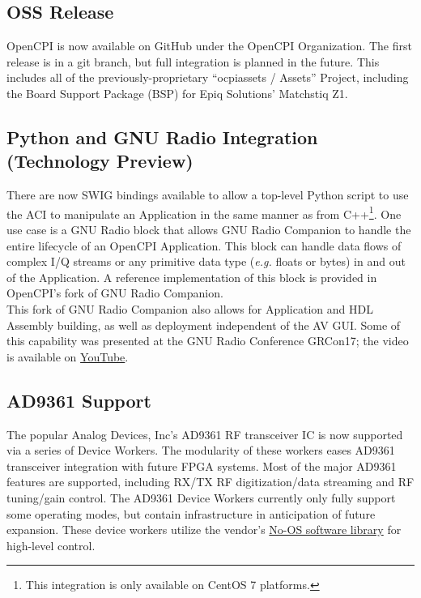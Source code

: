 \subsection{OSS Release} %
\label{sec:13_oss}
OpenCPI is now available on GitHub under the OpenCPI Organization. The first release is in a git branch, but full integration is planned in the future. This includes all of the previously-proprietary ``ocpiassets / Assets'' Project, including the Board Support Package (BSP) for Epiq Solutions' Matchstiq Z1.

\subsection{Python and GNU Radio Integration (Technology Preview)} %
There are now SWIG bindings available to allow a top-level Python script to use the ACI to manipulate an Application in the same manner as from C++\footnote{This integration is only available on CentOS 7 platforms.}. One use case is a GNU Radio block that allows GNU Radio Companion to handle the entire lifecycle of an OpenCPI Application. This block can handle data flows of complex I/Q streams or any primitive data type (\textit{e.g.} floats or bytes) in and out of the Application. A reference implementation of this block is provided in OpenCPI's fork of GNU Radio Companion.\\

This fork of GNU Radio Companion also allows for Application and HDL Assembly building, as well as deployment independent of the AV GUI. Some of this capability was presented at the GNU Radio Conference GRCon17; the video is available on \href{https://www.youtube.com/watch?v=CriLitW5vtM}{YouTube}.

\subsection{AD9361 Support}
\label{sec:13_ad9361}
The popular Analog Devices, Inc's AD9361 RF transceiver IC is now supported via a series of Device Workers. The modularity of these workers eases AD9361 transceiver integration with future FPGA systems. Most of the major AD9361 features are supported, including RX/TX RF digitization/data streaming and RF tuning/gain control. The AD9361 Device Workers currently only fully support some operating modes, but contain infrastructure in anticipation of future expansion. These device workers utilize the vendor's \href{https://github.com/analogdevicesinc/no-os}{No-OS software library} for high-level control.\\

